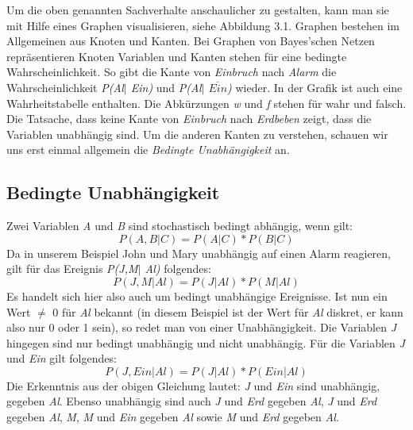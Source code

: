 Um die oben genannten Sachverhalte anschaulicher zu gestalten, kann man sie mit Hilfe eines Graphen visualisieren, siehe Abbildung 3.1.  Graphen bestehen im Allgemeinen aus Knoten und Kanten. Bei Graphen von Bayes'schen Netzen repräsentieren Knoten Variablen und Kanten stehen für eine bedingte Wahrscheinlichkeit. So gibt die Kante von \textit{Einbruch} nach \textit{Alarm} die Wahrscheinlichkeit \textit{P(Al$\vert$ Ein)} und \textit{P(Al$\vert$ $\overline{Ein}$)} wieder. In der Grafik ist auch eine Wahrheitstabelle enthalten. Die Abkürzungen \textit{w} und \textit{f} stehen für wahr und falsch. Die Tatsache, dass keine Kante von \textit{Einbruch} nach \textit{Erdbeben} zeigt, dass die Variablen unabhängig sind. Um die anderen Kanten zu verstehen, schauen wir uns erst einmal allgemein die \textit{Bedingte Unabhängigkeit} an. 
\subsection{Bedingte Unabhängigkeit}  
Zwei Variablen \textit{A} und \textit{B} sind stochastisch bedingt abhängig, wenn gilt:
\[ P(A,B\vert C) = P(A\vert C) * P(B\vert C)\]
Da in unserem Beispiel John und Mary unabhängig auf einen Alarm reagieren, gilt für das Ereignis \textit{P(J,M$\vert$ Al)} folgendes:
\[ P(J,M\vert Al) = P(J\vert Al) * P(M\vert Al)\]
Es handelt sich hier also auch um bedingt unabhängige Ereignisse. Ist nun ein Wert $\neq$ 0 für \textit{Al} bekannt (in diesem Beispiel ist der Wert für \textit{Al} diskret, er kann also nur 0 oder 1 sein), so redet man von einer Unabhängigkeit. Die Variablen \textit{J} hingegen sind nur bedingt unabhängig und nicht unabhängig. 
Für die Variablen \textit{J} und \textit{Ein} gilt folgendes:
\[ P(J,Ein\vert Al) = P(J\vert Al) * P(Ein\vert Al)\]
Die Erkenntnis aus der obigen Gleichung lautet: \textit{J} und \textit{Ein} sind unabhängig, gegeben \textit{Al}. Ebenso unabhängig sind auch \textit{J} und \textit{Erd} gegeben \textit{Al}, \textit{J} und \textit{Erd} gegeben \textit{Al}, \textit{M}, \textit{M} und \textit{Ein} gegeben \textit{Al} sowie \textit{M} und \textit{Erd} gegeben \textit{Al}. 

